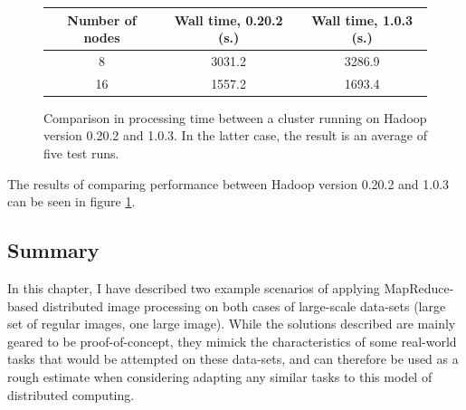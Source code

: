 \documentclass [12pt,a4paper]{report}
\begin{document}
\begin{figure}[h]
\begin{center}
\begin{tabular}{c | c | c}
Number of nodes & Wall time, 0.20.2 (s.) & Wall time, 1.0.3 (s.) \\ 
\hline
8 & 3031.2 & 3286.9 \\
16 & 1557.2 & 1693.4 \\
\end{tabular}
\caption[Comparison between Hadoop 0.20.2 and 1.0.3]{Comparison in processing time between a cluster running on Hadoop version 0.20.2 and 1.0.3. In the latter case, the result is an average of five test runs.}
\label{fig_hadoop_version_compare}
\end{center}
\end{figure}

The results of comparing performance between Hadoop version 0.20.2 and 1.0.3 can be seen in figure \ref{fig_hadoop_version_compare}.

\subsection{Summary}

In this chapter, I have described two example scenarios of applying MapReduce-based distributed image processing on both cases of large-scale data-sets (large set of regular images, one large image). While the solutions described are mainly geared to be proof-of-concept, they mimick the characteristics of some real-world tasks that would be attempted on these data-sets, and can therefore be used as a rough estimate when considering adapting any similar tasks to this model of distributed computing.


\end{document}
